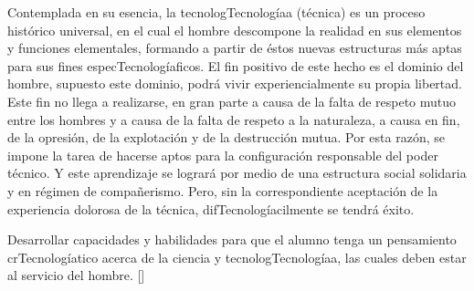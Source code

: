 \begin{syllabus}


\begin{justification}
Contemplada en su esencia, la tecnologTecnologíaa (técnica) es un proceso histórico universal, en el cual el hombre descompone la realidad en sus elementos y funciones elementales, formando a partir de éstos nuevas estructuras más aptas para sus fines especTecnologíaficos.
El fin positivo de este hecho es el dominio del hombre,  supuesto este dominio, podrá vivir experiencialmente su propia libertad. Este fin no llega a realizarse, en gran parte a causa de la falta de respeto mutuo entre los hombres y a causa de la falta de respeto a la naturaleza, a causa en fin, de la opresión, de la explotación y de la destrucción mutua.
Por esta razón, se impone la tarea de hacerse aptos para la configuración responsable del poder técnico. Y este aprendizaje se logrará por medio de una estructura social solidaria y en régimen de compañerismo. Pero, sin la correspondiente aceptación de la experiencia dolorosa de la técnica, difTecnologíacilmente se tendrá éxito.
\end{justification}

\begin{goals}
\item Desarrollar capacidades y habilidades para que el alumno tenga un pensamiento crTecnologíatico acerca de  la ciencia y tecnologTecnologíaa, las cuales deben estar al servicio del hombre.  [\Familiarity]
\end{goals}

\begin{outcomes}
    \item {}
    \item {}
\end{outcomes}

\begin{competences}
    \item {}
    \item {}
\end{competences}


\end{syllabus}
